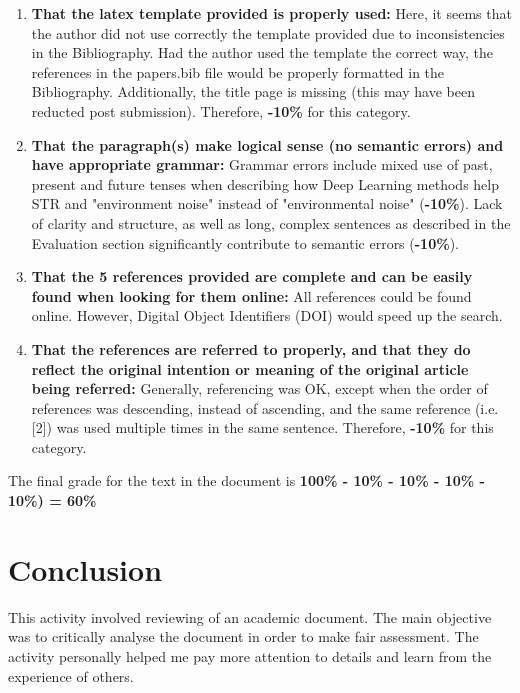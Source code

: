 \begin{enumerate}
 \item \textbf{That the latex template provided is properly used:} Here, it seems that the author did not use correctly the template provided due to inconsistencies in the Bibliography. Had the author used the template the correct way, the references in the papers.bib file would be properly formatted in the Bibliography. Additionally, the title page is missing (this may have been reducted post submission). Therefore, \textbf{-10\%} for this category.
 \item \textbf{That the paragraph(s) make logical sense (no semantic errors) and have appropriate grammar:} Grammar errors include mixed use of past, present and future tenses when describing how Deep Learning methods help STR and "environment noise" instead of "environmental noise" (\textbf{-10\%}). Lack of clarity and structure, as well as long, complex sentences as described in the Evaluation section significantly contribute to semantic errors (\textbf{-10\%}).
 \item \textbf{That the 5 references provided are complete and can be easily found when looking for them online:} All references could be found online. However, Digital Object Identifiers (DOI) would speed up the search.
 \item \textbf{That the references are referred to properly, and that they do reflect the original intention or meaning of the original article being referred:} Generally, referencing was OK, except when the order of references was descending, instead of ascending, and the same reference (i.e. [2]) was used multiple times in the same sentence. Therefore, \textbf{-10\%} for this category.
\end{enumerate}

The final grade for the text in the document is \textbf{100\% - 10\% - 10\% - 10\% - 10\%) = 60\%}

\section*{Conclusion}
This activity involved reviewing of an academic document. The main objective was to critically analyse the document in order to make fair assessment. The activity personally helped me pay more attention to details and learn from the experience of others. 






